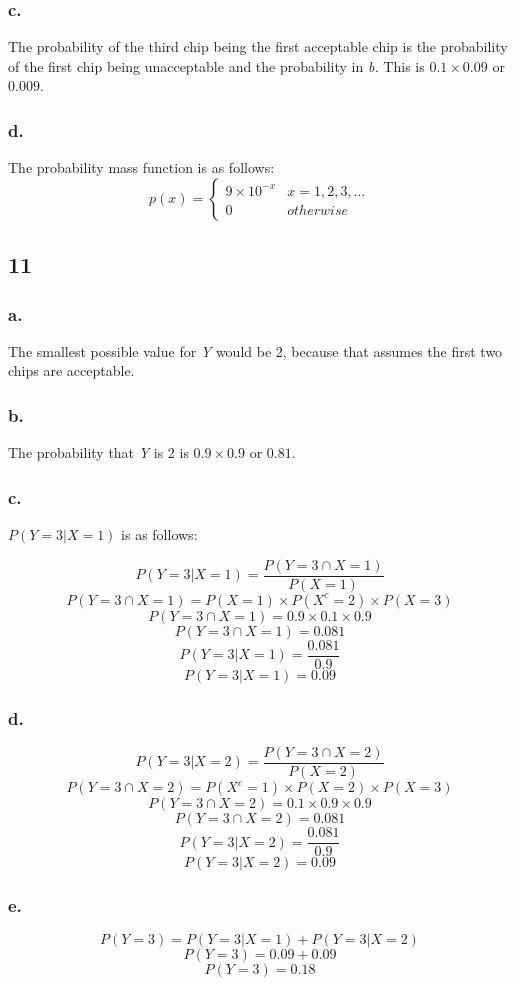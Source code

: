 \documentclass[11pt]{article}
\begin{document}
\subsubsection*{c.}
The probability of the third chip being the first acceptable chip is the
probability of the first chip being unacceptable and the probability in
\textit{b.} This is $0.1 \times 0.09$ or $0.009$. 

\subsubsection*{d.}
The probability mass function is as follows:
\[ p(x) = \left\{
    \begin{array}{ll}
        9 \times 10^{-x} & x = 1, 2, 3, \ldots \\
        0 & otherwise
    \end{array}
    \right.
\]

\subsection*{11}
\subsubsection*{a.}
The smallest possible value for \textit{Y} would be 2, because that assumes the
first two chips are acceptable. 

\subsubsection*{b.}
The probability that \textit{Y} is 2 is $0.9 \times 0.9$ or $0.81$.

\subsubsection*{c.}
$P(Y=3|X=1)$ is as follows:

\[ P(Y=3|X=1) = \frac{P(Y=3 \cap X=1)}{P(X=1)} \]
\[ P(Y=3 \cap X=1) = P(X=1) \times P(X^c=2) \times P(X=3) \]
\[ P(Y=3 \cap X=1) = 0.9 \times 0.1 \times 0.9 \]
\[ P(Y=3 \cap X=1) = 0.081 \]
\[ P(Y=3|X=1) = \frac{0.081}{0.9} \]
\[ P(Y=3|X=1) = 0.09 \]

\subsubsection*{d.}
\[ P(Y=3|X=2) = \frac{P(Y=3 \cap X=2)}{P(X=2)} \]
\[ P(Y=3 \cap X=2) = P(X^c=1) \times P(X=2) \times P(X=3) \]
\[ P(Y=3 \cap X=2) = 0.1 \times 0.9 \times 0.9 \]
\[ P(Y=3 \cap X=2) = 0.081 \]
\[ P(Y=3|X=2) = \frac{0.081}{0.9} \]
\[ P(Y=3|X=2) = 0.09 \]

\subsubsection*{e.}
\[ P(Y=3) = P(Y=3|X=1) + P(Y=3|X=2) \]
\[ P(Y=3) = 0.09 + 0.09 \]
\[ P(Y=3) = 0.18 \]
\end{document}
